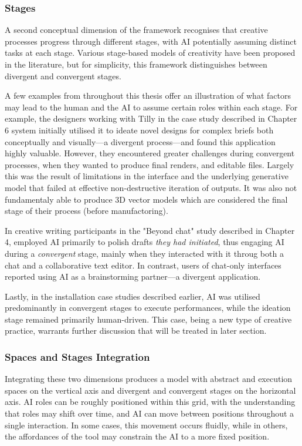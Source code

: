 \subsubsection{Stages}

A second conceptual dimension of the framework recognises that creative processes progress through different stages, with AI potentially assuming distinct tasks at each stage. Various stage-based models of creativity have been proposed in the literature, but for simplicity, this framework distinguishes between divergent and convergent stages.

A few examples from throughout this thesis offer an illustration of what factors may lead to the human and the AI to assume certain roles within each stage. For example, the designers working with Tilly in the case study described in Chapter 6 system initially utilised it to ideate novel designs for complex briefs both conceptually and visually—a divergent process—and found this application highly valuable. However, they encountered greater challenges during convergent processes, when they wanted to produce final renders, and editable files. Largely this was the result of limitations in the interface and the underlying generative model that failed at effective non-destructive iteration of outputs. It was also not fundamentaly able to produce 3D vector models which are considered the final stage of their process (before manufactoring). 

In creative writing participants in the "Beyond chat" study described in Chapter 4, employed AI primarily to polish drafts \textit{they had initiated}, thus engaging AI during a \textit{convergent} stage, mainly when they interacted with it throug both a chat and a collaborative text editor. In contrast, users of chat-only interfaces reported using AI as a brainstorming partner—a divergent application. 

Lastly, in the installation case studies described earlier, AI was utilised predominantly in convergent stages to execute performances, while the ideation stage remained primarily human-driven. This case, being a new type of creative practice, warrants further discussion that will be treated in later section.

\subsubsection{Spaces and Stages Integration}

Integrating these two dimensions produces a model with abstract and execution spaces on the vertical axis and divergent and convergent stages on the horizontal axis. AI roles can be roughly positioned within this grid, with the understanding that roles may shift over time, and AI can move between positions throughout a single interaction. In some cases, this movement occurs fluidly, while in others, the affordances of the tool may constrain the AI to a more fixed position.

